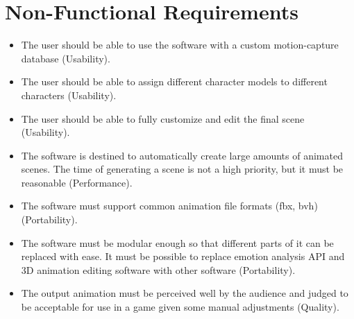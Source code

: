 \section{Non-Functional Requirements}

\begin{itemize}
\item The user should be able to use the software with a custom motion-capture database (Usability).
\item The user should be able to assign different character models to different characters (Usability).
\item The user should be able to fully customize and edit the final scene (Usability).
\item The software is destined to automatically create large amounts of animated scenes. The time of generating a scene is not a high priority, but it must be reasonable (Performance).
\item The software must support common animation file formats (fbx, bvh) (Portability).
\item The software must be modular enough so that different parts of it can be replaced with ease. It must be possible to replace emotion analysis API and 3D animation editing software with other software (Portability).
\item The output animation must be perceived well by the audience and judged to be acceptable for use in a game given some manual adjustments (Quality).
\end{itemize}
